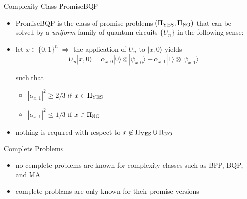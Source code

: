 \documentclass[slideColor]{prosper}
\renewcommand{\>}{\rangle}
\newcommand{\<}{\langle}
\begin{document}
\begin{slide}{Complexity Class PromiseBQP}
\begin{itemize}
\item PromiseBQP is the class of promise problems $(\Pi_{\rm YES},\Pi_{\rm NO})$ that can be solved by a {\em uniform} family of quantum circuits $\{U_n\}$ in the following sense:

\bigskip
\item let $x\in\{0,1\}^n$ $\Rightarrow$ the application of $U_n$ to $|x,0\>$ yields
\[
U_n |x,0\> = \alpha_{x,0}|0\> \otimes |\psi_{x,0}\> + \alpha_{x,1}|1\> \otimes |\psi_{x,1}\>
\]

such that 

\medskip
\begin{itemize}
\item $|\alpha_{x,1}|^2\ge 2/3$ if $x\in\Pi_{\rm YES}$
\item $|\alpha_{x,1}|^2\le 1/3$ if $x\in\Pi_{\rm NO}$
\end{itemize}

\medskip
\item
nothing is required with respect to $x\not\in\Pi_{\rm YES}\cup \Pi_{\rm NO}$
\end{itemize}
\end{slide}


\begin{slide}{Complete Problems}
\begin{itemize}
\item no complete problems are known for complexity classes such as BPP, BQP, and MA

\medskip
\item complete problems are only known for their promise versions 
\end{itemize}
\end{slide}

\end{document}
